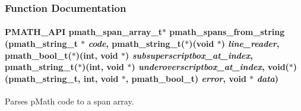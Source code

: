 \subsubsection{Function Documentation}
\hypertarget{group__parser_g877ac507e27c8791a265105f796f3cef}{
\paragraph[{pmath\_\-spans\_\-from\_\-string}]{\setlength{\rightskip}{0pt plus 5cm}PMATH\_\-API {\bf pmath\_\-span\_\-array\_\-t}$\ast$ pmath\_\-spans\_\-from\_\-string ({\bf pmath\_\-string\_\-t} $\ast$ {\em code}, \/  {\bf pmath\_\-string\_\-t}($\ast$)(void $\ast$) {\em line\_\-reader}, \/  {\bf pmath\_\-bool\_\-t}($\ast$)(int, void $\ast$) {\em subsuperscriptbox\_\-at\_\-index}, \/  {\bf pmath\_\-string\_\-t}($\ast$)(int, void $\ast$) {\em underoverscriptbox\_\-at\_\-index}, \/  void($\ast$)({\bf pmath\_\-string\_\-t}, int, void $\ast$, {\bf pmath\_\-bool\_\-t}) {\em error}, \/  void $\ast$ {\em data})}\hfill}
\label{group__parser_g877ac507e27c8791a265105f796f3cef}


Parses pMath code to a span array. 

